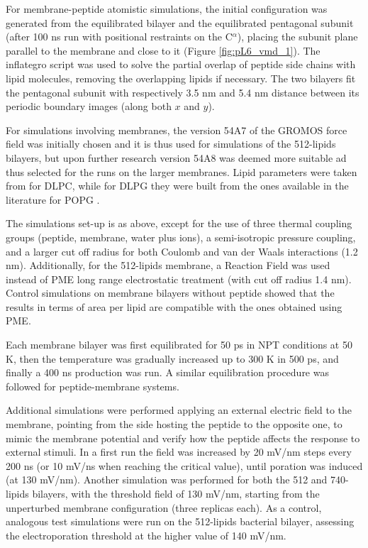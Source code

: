 For membrane-peptide atomistic simulations, the initial configuration was generated from the equilibrated bilayer and the equilibrated pentagonal subunit (after 100 ns run with positional restraints on the C$^\alpha$), placing the subunit plane parallel to the membrane and close to it (Figure \ref{fig:pL6_vmd_1}).
%
The inflategro script \citep{Kandt2007} was used to solve the partial overlap of peptide side chains with lipid molecules, removing the overlapping lipids if necessary.
%
The two bilayers fit the pentagonal subunit with respectively 3.5 nm and 5.4 nm distance between its periodic boundary images (along both $x$ and $y$).

For simulations involving membranes, the version 54A7 of the GROMOS force field \citep{Schmid2011} was initially chosen and it is thus used for simulations of the 512-lipids bilayers, but upon further research version 54A8 \citep{Oostenbrink2005, Reif2013} was deemed more suitable ad thus selected for the runs on the larger membranes. Lipid parameters were taken from \citep{PogerOrig} for DLPC, while for DLPG they were built from the ones available in the literature for POPG \citep{Kukol2009}.

The simulations set-up is as above, except for the use of three thermal coupling groups (peptide, membrane, water plus ions), a semi-isotropic pressure coupling, and a larger cut off radius for both Coulomb and van der Waals interactions (1.2 nm). Additionally, for the 512-lipids membrane, a Reaction Field \citep{Tironi1995} was used instead of PME long range electrostatic treatment (with cut off radius 1.4 nm). Control simulations on membrane bilayers without peptide showed that the results in terms of area per lipid are compatible with the ones obtained using PME.

Each membrane bilayer was first equilibrated for 50 ps in NPT conditions at 50 K, then the temperature was gradually increased up to 300 K in 500 ps, and finally a 400 ns production was run. A similar equilibration procedure was followed for peptide-membrane systems.

Additional simulations were performed applying an external electric field to the membrane, pointing from the side hosting the peptide to the opposite one, to mimic the membrane potential and verify how the peptide affects the response to external stimuli.
%
In a first run the field was increased by 20 mV/nm steps every 200 ns (or 10 mV/ns when reaching the critical value), until poration was induced (at 130 mV/nm).
%
Another simulation was performed for both the 512 and 740-lipids bilayers, with the threshold field of 130 mV/nm, starting from the unperturbed membrane configuration (three replicas each).
%
As a control, analogous test simulations were run on the 512-lipids bacterial bilayer, assessing the electroporation threshold at the higher value of 140 mV/nm.

